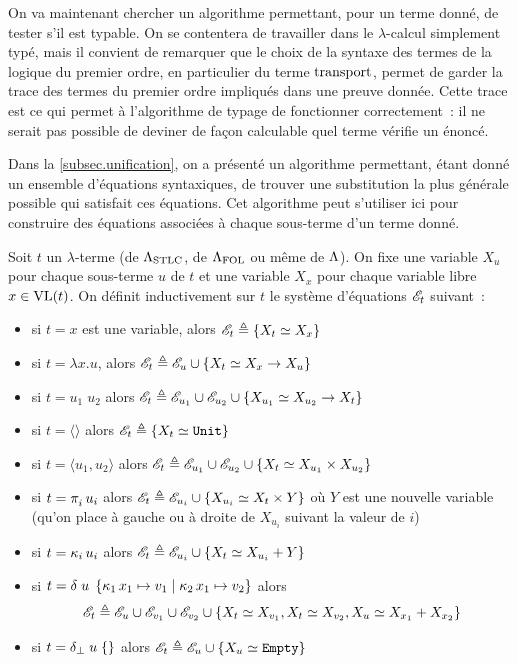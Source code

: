 On va maintenant chercher un algorithme permettant, pour un terme donné, de
tester s'il est typable. On se contentera de travailler dans le $\lambda$-calcul
simplement typé, mais il convient de remarquer que le choix de la syntaxe des
termes de la logique du premier ordre, en particulier du terme
$\operatorname{transport}$, permet de garder la trace des termes du premier ordre impliqués dans
une preuve donnée. Cette trace est ce qui permet à l'algorithme de typage de
fonctionner correctement~: il ne serait pas possible de deviner de façon
calculable quel terme vérifie un énoncé.

Dans la \cref{subsec.unification}, on a présenté un algorithme permettant,
étant donné un ensemble d'équations syntaxiques, de trouver une substitution la
plus générale possible qui satisfait ces équations. Cet algorithme peut
s'utiliser ici pour construire des équations associées à chaque sous-terme d'un
terme donné.

\begin{definition}
  Soit $t$ un $\lambda$-terme (de $\Lambda_{\mathrm{STLC}}$, de $\Lambda_{\mathrm{FOL}}$ ou même de
  $\Lambda$). On fixe une variable $X_u$ pour chaque sous-terme $u$ de $t$ et
  une variable $X_x$ pour chaque variable libre $x \in \operatorname{VL}(t)$.
  On définit inductivement sur $t$ le système d'équations $\mathscr{E}_t$ suivant~:
  \begin{itemize}
  \item si $t = x$ est une variable, alors $\mathscr{E}_t \triangleq \{X_t \simeq X_x\}$
  \item si $t = \lambda x.u$, alors
    $\mathscr{E}_t \triangleq \mathscr{E}_u \cup \{X_t \simeq X_x \to X_u\}$
  \item si $t = u_1\;u_2$ alors
    $\mathscr{E}_t \triangleq \mathscr{E}_{u_1}\cup \mathscr{E}_{u_2}\cup
    \{X_{u_1} \simeq X_{u_2}\to X_t\}$
  \item si $t = \langle\rangle$ alors $\mathscr{E}_t \triangleq \{X_t \simeq {\normalfont\texttt{Unit}}\}$
  \item si $t = \langle u_1,u_2\rangle$ alors
    $\mathscr{E}_t \triangleq \mathscr{E}_{u_1}\cup\mathscr{E}_{u_2}\cup
    \{X_t \simeq X_{u_1}\times X_{u_2}\}$
  \item si $t = \mathop{\pi_{i}^{}} u_i$ alors
    $\mathscr{E}_t \triangleq \mathscr{E}_{u_i} \cup \{ X_{u_i} \simeq X_t\times Y\}$
    où $Y$ est une nouvelle variable (qu'on place à gauche ou à droite de
    $X_{u_i}$ suivant la valeur de $i$)
  \item si $t = \mathop{\kappa_{i}} u_i$ alors
    $\mathscr{E}_t \triangleq \mathscr{E}_{u_i}\cup \{X_t \simeq X_{u_i}+ Y\}$
  \item si $t = \delta\;u\;\left\{\mathop{\kappa_{1}} x_1\mapsto v_1 \;\middle\vert\; \mathop{\kappa_{2}} x_1\mapsto v_2\right\}$ alors
    \[\mathscr{E}_t \triangleq \mathscr{E}_u\cup\mathscr{E}_{v_1}\cup\mathscr{E}_{v_2}\cup
    \{X_t \simeq X_{v_1},X_t\simeq X_{v_2},X_u\simeq X_{x_1}+X_{x_2}\}\]
  \item si $t = \delta_{\bot}\;u\;\{\}$ alors
    $\mathscr{E}_t \triangleq \mathscr{E}_u \cup \{X_u \simeq {\normalfont\texttt{Empty}}\}$
  \end{itemize}
\end{definition}

